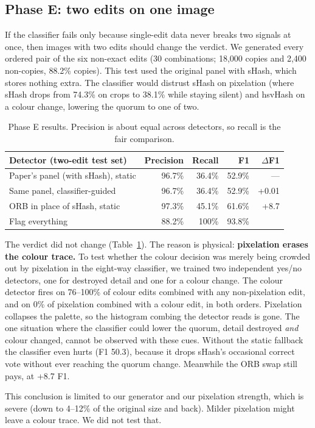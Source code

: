 \subsection{Phase E: two edits on one image}

If the classifier fails only because single-edit data never breaks two signals at once, then
images with two edits should change the verdict. We generated every ordered pair of the six
non-exact edits (30 combinations; 18,000 copies and 2,400 non-copies, 88.2\% copies). This
test used the original panel with sHash, which stores nothing extra. The classifier would
distrust sHash on pixelation (where sHash drops from 74.3\% on crops to 38.1\% while staying
silent) and hsvHash on a colour change, lowering the quorum to one of two.

\begin{table}[ht]
\centering
\begin{tabular}{@{}lrrrr@{}}
\toprule
Detector (two-edit test set) & Precision & Recall & F1 & $\Delta$F1 \\
\midrule
Paper's panel (with sHash), static     & 96.7\% & 36.4\% & 52.9\% & --- \\
Same panel, classifier-guided          & 96.7\% & 36.4\% & 52.9\% & +0.01 \\
ORB in place of sHash, static          & 97.3\% & 45.1\% & 61.6\% & +8.7 \\
\midrule
Flag everything                        & 88.2\% & 100\%  & 93.8\% & \\
\bottomrule
\end{tabular}
\caption{Phase E results. Precision is about equal across detectors, so recall is the fair
comparison.}
\label{tab:phasee}
\end{table}

The verdict did not change (Table~\ref{tab:phasee}). The reason is physical: \textbf{pixelation
erases the colour trace.} To test whether the colour decision was merely being crowded out by
pixelation in the eight-way classifier, we trained two independent yes/no detectors, one for
destroyed detail and one for a colour change. The colour detector fires on 76--100\% of
colour edits combined with any non-pixelation edit, and on 0\% of pixelation combined with a
colour edit, in both orders. Pixelation collapses the palette, so the histogram combing the
detector reads is gone. The one situation where the classifier could lower the quorum, detail
destroyed \emph{and} colour changed, cannot be observed with these cues. Without the static
fallback the classifier even hurts (F1 50.3), because it drops sHash's occasional correct vote
without ever reaching the quorum change. Meanwhile the ORB swap still pays, at +8.7 F1.

This conclusion is limited to our generator and our pixelation strength, which is severe
(down to 4--12\% of the original size and back). Milder pixelation might leave a colour trace.
We did not test that.
